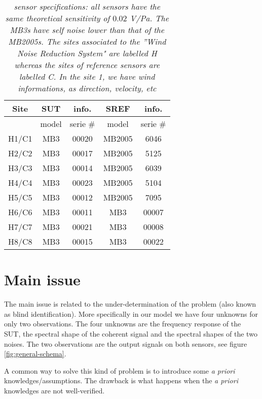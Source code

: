 \begin{table}[h]
\begin{center}
\begin{tabular}{|c||cc|cc||}
\hline
Site & SUT & info.& SREF & info.
\\
\hline
     & model&serie \#     & model&serie \#
\\
H1/C1& MB3 & 00020  & MB2005& 6046
\\
H2/C2& MB3  &  00017  & MB2005& 5125
\\
H3/C3& MB3  &  00014  & MB2005 &6039
\\
H4/C4& MB3  &  00023  & MB2005& 5104
\\
H5/C5& MB3   & 00012  & MB2005 &7095
\\
H6/C6& MB3  &  00011  & MB3 &00007
\\
H7/C7& MB3   & 00021  & MB3 &00008
\\
H8/C8& MB3   & 00015  & MB3 &00022
\\
\hline
\end{tabular}
\parbox{12 cm}
{
    \caption{\protect\small\it  sensor specifications: all sensors have the same theoretical sensitivity of $0.02$ V/Pa. The MB3s have self noise lower than that of the MB2005s. The sites associated to the ''Wind Noise Reduction System" are labelled H whereas  the sites of reference sensors are labelled C. In the site 1, we have wind informations, as direction, velocity, etc}
    \label{tab:sensor-specifications}
}
\end{center}
\end{table}


 \newpage
\section{Main issue}

The main issue is related to the under-determination of the problem (also known as blind identification). More specifically in our model we have four unknowns for only two observations. The four unknowns are the frequency response of the SUT, the spectral shape of the coherent signal and the spectral shapes of the two noises. The two observations are the output signals on both sensors, see figure \ref{fig:general-schema}.

A common way to solve this kind of problem is to introduce some {\it a priori} knowledges/assumptions. The drawback is what happens when the {\it a priori} knowledges are not well-verified.

